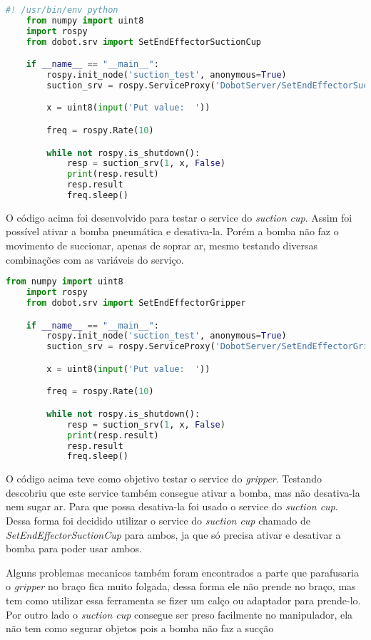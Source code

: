 \begin{lstlisting}[language=Python]
    #! /usr/bin/env python
    from numpy import uint8
    import rospy
    from dobot.srv import SetEndEffectorSuctionCup

    if __name__ == "__main__":
        rospy.init_node('suction_test', anonymous=True)
        suction_srv = rospy.ServiceProxy('DobotServer/SetEndEffectorSuctionCup', SetEndEffectorSuctionCup)

        x = uint8(input('Put value:  '))

        freq = rospy.Rate(10)

        while not rospy.is_shutdown():
            resp = suction_srv(1, x, False)
            print(resp.result)
            resp.result
            freq.sleep()
\end{lstlisting}

O código acima foi desenvolvido para testar o service do \textit{suction cup}. Assim foi possível ativar a bomba pneumática e desativa-la. Porém a bomba não faz o movimento de succionar, apenas de soprar ar, mesmo testando diversas combinações com as variáveis do serviço.

\begin{lstlisting}[language=Python]
    from numpy import uint8
    import rospy
    from dobot.srv import SetEndEffectorGripper

    if __name__ == "__main__":
        rospy.init_node('suction_test', anonymous=True)
        suction_srv = rospy.ServiceProxy('DobotServer/SetEndEffectorGripper', SetEndEffectorGripper)

        x = uint8(input('Put value:  '))

        freq = rospy.Rate(10)

        while not rospy.is_shutdown():
            resp = suction_srv(1, x, False)
            print(resp.result)
            resp.result
            freq.sleep()
\end{lstlisting}

O código acima teve como objetivo testar o service do \textit{gripper}. Testando descobriu que este service também consegue ativar a bomba, mas não desativa-la nem sugar ar. Para que possa desativa-la foi usado o service do \textit{suction cup}. Dessa forma foi decidido utilizar o service do \textit{suction cup} chamado de \textit{SetEndEffectorSuctionCup} para ambos, ja que só precisa ativar e desativar a bomba para poder usar ambos.

Alguns problemas mecanicos também foram encontrados a parte que parafusaria o \textit{gripper} no braço fica muito folgada, dessa forma ele não prende no braço, mas tem como utilizar essa ferramenta se fizer um calço ou adaptador para prende-lo. Por outro lado o \textit{suction cup} consegue ser preso facilmente no manipulador, ela não tem como segurar objetos pois a bomba não faz a sucção
